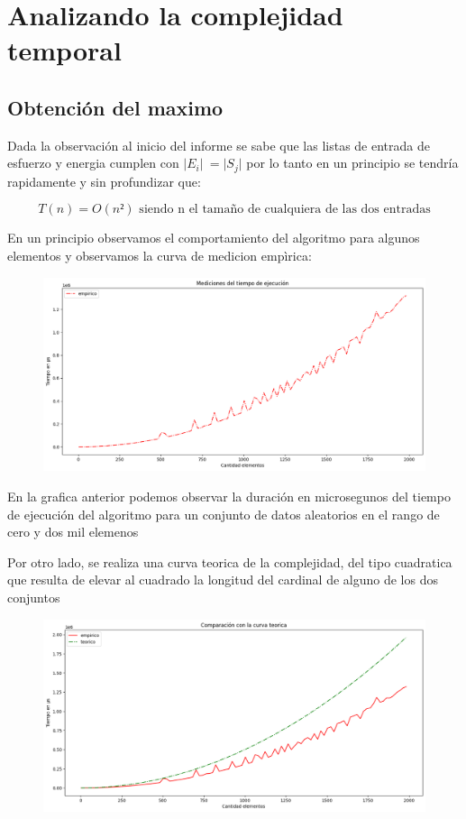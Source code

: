 \section{Analizando la complejidad temporal}

\subsection{Obtención del maximo}
Dada la observación al inicio del informe se sabe que las listas de entrada de esfuerzo y energia cumplen con $\lvert E_i \lvert \ = \lvert S_j \lvert$ por lo tanto en un principio se tendría rapidamente y sin profundizar que:

$$
T(n) = O(n²) \text{ siendo n el tamaño de cualquiera de las dos entradas}
$$

En un principio observamos el comportamiento del algoritmo para algunos elementos y observamos la curva de medicion empìrica:

\begin{figure}[H]
    \centering
    \includegraphics[width=1\textwidth]{graficos/tiemposejecucion.png}
\end{figure}

En la grafica anterior podemos observar la duración en microsegunos del tiempo de ejecución del algoritmo para un conjunto de datos aleatorios en el rango de cero y dos mil elemenos

Por otro lado, se realiza una curva teorica de la complejidad, del tipo cuadratica que resulta de elevar al cuadrado la longitud del cardinal de alguno de los dos conjuntos 

\begin{figure}[H]
    \centering
    \includegraphics[width=1\textwidth]{graficos/vsteorica.png}
\end{figure}

